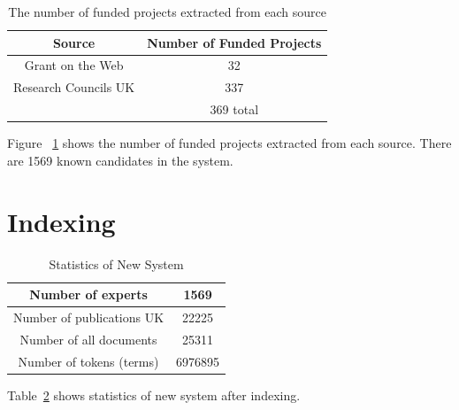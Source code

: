 \begin{table}
\centering
\begin{tabular}{|c|c|}
\hline \textbf{Source} & \textbf{Number of Funded Projects} \\
\hline Grant on the Web & 32 \\
\hline Research Councils UK & 337 \\
\hline   & 369 total \\ 
\hline
\end{tabular}
\caption{The number of funded projects extracted from each source} \label{table:stats}
\end{table}
Figure ~\ref{table:stats} shows the number of funded projects extracted from each source. There are 1569 known candidates in the system.

\section{Indexing}
\begin{table}
\centering
\begin{tabular}{|c|c|}
\hline Number of experts & 1569 \\
\hline Number of publications UK & 22225 \\
\hline Number of all documents   & 25311 \\ 
\hline Number of tokens (terms) & 6976895 \\
\hline
\end{tabular}
\caption{Statistics of New System} \label{table:newtstats}
\end{table}
Table~\ref{table:newtstats} shows statistics of new system after indexing.


